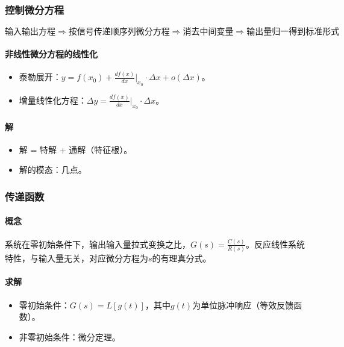 \documentclass[
12pt, %
a4paper, 
oneside, %
headinclude,footinclude, %
]{scrartcl}
\begin{document}
\subsubsection[控制微分方程]{控制微分方程}
$$ \text{输入输出方程} \Rightarrow \text{按信号传递顺序列微分方程} \Rightarrow \text{消去中间变量} \Rightarrow \text{输出量归一得到标准形式} $$
\paragraph{非线性微分方程的线性化}
\begin{itemize}
\item 泰勒展开：$ y = f(x_0) + \frac{d f(x)}{dx}|_{x_0} \cdot \Delta x + o(\Delta x) $。
\item 增量线性化方程：$ \Delta y = \frac{d f(x)}{dx}|_{x_0} \cdot \Delta x $。
\end{itemize}
\paragraph{解}
\begin{itemize}
\item 解 = 特解 + 通解（特征根）。
\item 解的模态：几点。
\end{itemize}
\subsubsection[传递函数]{传递函数}
\paragraph{概念}
系统在零初始条件下，输出输入量拉式变换之比，$ G(s) = \frac{C(s)}{R(s)} $。反应线性系统特性，与输入量无关，对应微分方程为$ s $的有理真分式。
\paragraph{求解}
\begin{itemize}
\item 零初始条件：$ G(s) = L[g(t)] $，其中$ g(t) $为单位脉冲响应（等效反馈函数）。
\item 非零初始条件：微分定理。
\end{itemize}
\end{document}
